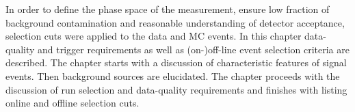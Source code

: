 In order to define the phase space of the measurement, ensure low fraction of background contamination and reasonable understanding of detector acceptance, selection cuts were applied to the data and MC events. In this chapter data-quality and trigger requirements as well as (on-)off-line event selection criteria are described. The chapter starts with a discussion of characteristic features of signal events. Then background sources are elucidated. The chapter proceeds with the discussion of run selection and data-quality requirements and finishes with listing online and offline selection cuts.


